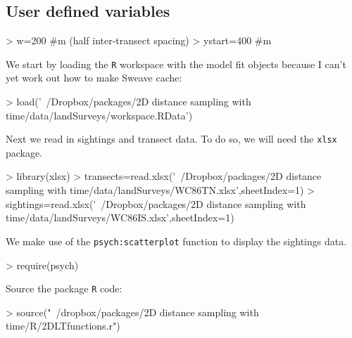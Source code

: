 \documentclass{article}
\begin{document}
\subsection{User defined variables}
\begin{Schunk}
\begin{Sinput}
> w=200 #m (half inter-transect spacing)
> ystart=400 #m  
\end{Sinput}
\end{Schunk}
We start by loading the \texttt{R} workspace with the model fit objects because I can't yet work out how to make Sweave cache:
\begin{Schunk}
\begin{Sinput}
> load('~/Dropbox/packages/2D distance sampling with time/data/landSurveys/workspace.RData')
\end{Sinput}
\end{Schunk}
Next we read in sightings and transect data.  To do so, we will need the \texttt{xlsx} package.
\begin{Schunk}
\begin{Sinput}
>   library(xlsx)
> transects=read.xlsx('~/Dropbox/packages/2D distance sampling with time/data/landSurveys/WC86TN.xlsx',sheetIndex=1)
> sightings=read.xlsx('~/Dropbox/packages/2D distance sampling with time/data/landSurveys/WC86IS.xlsx',sheetIndex=1)  
\end{Sinput}
\end{Schunk}
We make use of the \texttt{psych:scatterplot} function to display the sightings data.
\begin{Schunk}
\begin{Sinput}
> require(psych)
\end{Sinput}
\end{Schunk}
Source the package \texttt{R} code:
\begin{Schunk}
\begin{Sinput}
> source("~/dropbox/packages/2D distance sampling with time/R/2DLTfunctions.r")
\end{Sinput}
\end{Schunk}
\end{document}
